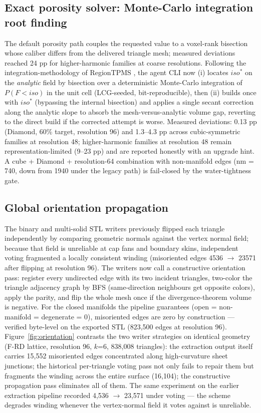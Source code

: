 \documentclass[5p,times,authoryear]{elsarticle}
\begin{document}
\subsection{Exact porosity solver: Monte-Carlo integration root finding}
The default porosity path couples the requested value to a voxel-rank bisection whose caliber
differs from the delivered triangle mesh; measured deviations reached 24 pp for higher-harmonic
families at coarse resolutions. Following the integration-methodology of RegionTPMS
\cite{karakoc2021regiontpms}, the agent CLI now (i) locates $iso^{*}$ on the \emph{analytic} field by
bisection over a deterministic Monte-Carlo integration of $P(F<iso)$ in the unit cell (LCG-seeded,
bit-reproducible), then (ii) builds once with $iso^{*}$ (bypassing the internal bisection) and
applies a single secant correction along the analytic slope to absorb the mesh-versus-analytic
volume gap, reverting to the direct build if the corrected attempt is worse. Measured deviations:
0.13 pp (Diamond, 60\% target, resolution 96) and 1.3--4.3 pp across cubic-symmetric families at
resolution 48; higher-harmonic families at resolution 48 remain representation-limited (9--23 pp)
and are reported honestly with an upgrade hint. A cube + Diamond + resolution-64 combination with
non-manifold edges (nm = 740, down from 1940 under the legacy path) is fail-closed by the
water-tightness gate.

\subsection{Global orientation propagation}
The binary and multi-solid STL writers previously flipped each triangle independently by comparing
geometric normals against the vertex normal field; because that field is unreliable at cap fans and
boundary skins, independent voting fragmented a locally consistent winding (misoriented edges
4536 $\rightarrow$ 23571 after flipping at resolution 96). The writers now call a constructive
orientation pass: register every undirected edge with its two incident triangles, two-color the
triangle adjacency graph by BFS (same-direction neighbours get opposite colors), apply the parity,
and flip the whole mesh once if the divergence-theorem volume is negative. For the closed manifolds
the pipeline guarantees (open = non-manifold = degenerate = 0), misoriented edges are zero by
construction --- verified byte-level on the exported STL (823,500 edges at resolution 96).
Figure~\ref{fig:orientation} contrasts the two writer strategies on identical geometry (F-RD
lattice, resolution 96, $k$=6, 838{,}008 triangles): the extraction output itself carries 15{,}552
misoriented edges concentrated along high-curvature sheet junctions; the historical per-triangle
voting pass not only fails to repair them but fragments the winding across the entire surface
(16{,}104); the constructive propagation pass eliminates all of them. The same experiment on the
earlier extraction pipeline recorded 4{,}536 $\rightarrow$ 23{,}571 under voting --- the scheme
degrades winding whenever the vertex-normal field it votes against is unreliable.
\end{document}
